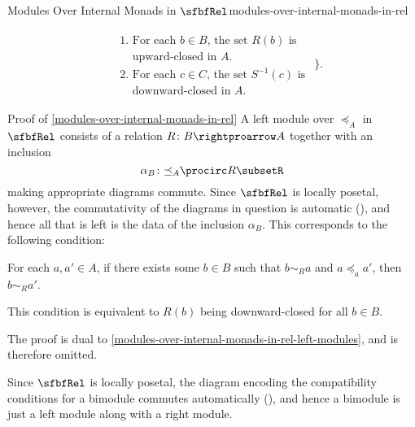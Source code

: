 \begin{proposition}{Modules Over Internal Monads in $\sfbfRel$}{modules-over-internal-monads-in-rel}
\begin{enumerate}
\[\begin{gathered}
                        \begin{aligned}
                            &\text{1. For each $b\in B$, the set $R(b)$ is}\\
                            &\phantom{\text{1. }}\text{upward-closed in $A$.}\\%
                            &\text{2. For each $c\in C$, the set $S^{-1}(c)$ is}\\
                            &\phantom{\text{2. }}\text{downward-closed in $A$.}%
                        \end{aligned}
                    \end{gathered}
                \}.%
            \]%
    \end{enumerate}
\end{proposition}
\begin{Proof}{Proof of \cref{modules-over-internal-monads-in-rel}}%
    A left module over $\mathord{\preceq_{A}}$ in $\sfbfRel$ consists of a relation $R\colon B\rightproarrow A$ together with an inclusion
    \[
        \alpha_{B}%
        \colon%
        \mathord{\preceq_{A}}\procirc R%
        \subset%
        R
    \]%
    making appropriate diagrams commute. Since $\sfbfRel$ is locally posetal, however, the commutativity of the diagrams in question is automatic (), and hence all that is left is the data of the inclusion $\alpha_{B}$. This corresponds to the following condition:
    \begin{itemize}
        \itemstar For each $a,a'\in A$, if there exists some $b\in B$ such that $b\sim_{R}a$ and $a\preceq_{a}a'$, then $b\sim_{R}a'$.
    \end{itemize}
    This condition is equivalent to $R(b)$ being downward-closed for all $b\in B$.

    The proof is dual to \cref{modules-over-internal-monads-in-rel-left-modules}, and is therefore omitted.

    Since $\sfbfRel$ is locally posetal, the diagram encoding the compatibility conditions for a bimodule commutes automatically (), and hence a bimodule is just a left module along with a right module.
\end{Proof}
